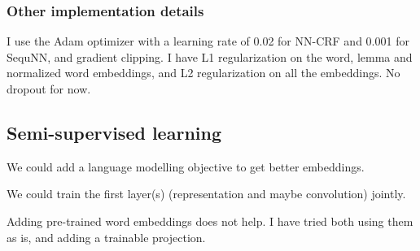 \documentclass[10pt,a4paper]{article}
\begin{document}
\subsubsection{Other implementation details}

I use the Adam optimizer with a learning rate of 0.02 for NN-CRF and 0.001 for SequNN, and gradient clipping. I have L1 regularization on the word, lemma and normalized word embeddings, and L2 regularization on all the embeddings. No dropout for now.

\subsection{Semi-supervised learning}

We could add a language modelling objective to get better embeddings.

We could train the first layer(s) (representation and maybe convolution) jointly.

Adding pre-trained word embeddings does not help. I have tried both using them as is, and adding a trainable projection.

\nocite{*}
{}

\end{document}
